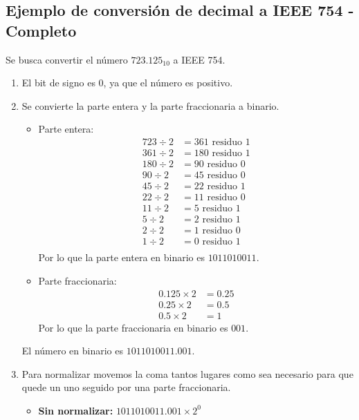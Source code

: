\subsection{Ejemplo de conversión de decimal a IEEE 754 - Completo}
Se busca convertir el número $723.125_{10}$ a IEEE 754.
\begin{enumerate}
    \item El bit de signo es 0, ya que el número es positivo.
    \item Se convierte la parte entera y la parte fraccionaria a binario.
    \begin{itemize}
        \item Parte entera:
        \begin{align*}
            723 \div 2 &= 361 \text{ residuo } 1 \\
            361 \div 2 &= 180 \text{ residuo } 1 \\
            180 \div 2 &= 90 \text{ residuo } 0 \\
            90 \div 2 &= 45 \text{ residuo } 0 \\
            45 \div 2 &= 22 \text{ residuo } 1 \\
            22 \div 2 &= 11 \text{ residuo } 0 \\
            11 \div 2 &= 5 \text{ residuo } 1 \\
            5 \div 2 &= 2 \text{ residuo } 1 \\
            2 \div 2 &= 1 \text{ residuo } 0 \\
            1 \div 2 &= 0 \text{ residuo } 1 \\
        \end{align*}
        Por lo que la parte entera en binario es $1011010011$.
        \item Parte fraccionaria:
        \begin{align*}
            0.125 \times 2 &= 0.25 \\
            0.25 \times 2 &= 0.5 \\
            0.5 \times 2 &= 1
        \end{align*}
        Por lo que la parte fraccionaria en binario es $001$.
    \end{itemize}
    El número en binario es $1011010011.001$.
    \item Para normalizar movemos la coma tantos lugares como sea necesario para que quede un uno seguido por una parte fraccionaria.
    \begin{itemize}
        \item \textbf{Sin normalizar:} $1011010011.001 \times 2^0$

\end{itemize}
\end{enumerate}
